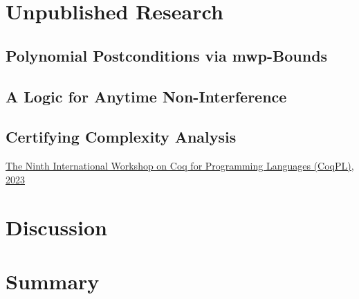 \chapter{Unpublished Research}\label{ch:unpublished-research}
\clearpage

    \section{Polynomial Postconditions via mwp-Bounds}\label{sec:postcond}
    \pageIconFm
    \clearpage
    
    \clearpage

    \section{A Logic for Anytime Non-Interference}\label{sec:anytime}
    \pageIconSecurity
    \clearpage
    {}
    \clearpage

    \section{Certifying Complexity Analysis}\label{certcpx}
    \pageIconFm
    \ainfo{\CTNT}
    {\href{https://popl23.sigplan.org/home/CoqPL-2023}
    {The Ninth International Workshop on Coq for Programming Languages (CoqPL), 2023}}
    \clearpage
    \clearpage

\chapter{Discussion}\label{ch:discussion}


\chapter{Summary}\label{ch:summary}


